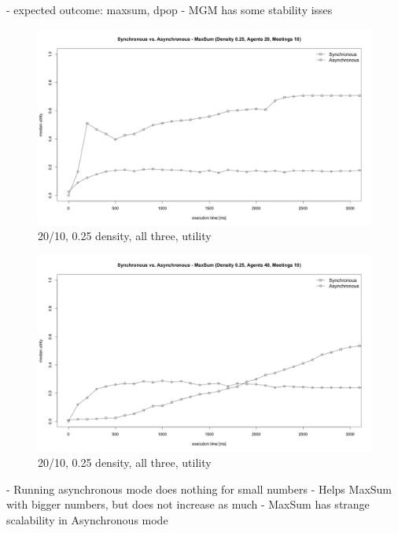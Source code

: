 - expected outcome: maxsum, dpop
- MGM has some stability isses
\begin{figure}[H]
\centering
\includegraphics[width=430px]{graphics/experiments/static/st_11}
\caption{20/10, 0.25 density, all three, utility}
\label{fig:mgm_graph}
\end{figure}
\begin{figure}[H]
\centering
\includegraphics[width=430px]{graphics/experiments/static/st_12}
\caption{20/10, 0.25 density, all three, utility}
\label{fig:mgm_graph}
\end{figure}

- Running asynchronous mode does nothing for small numbers
- Helps MaxSum with bigger numbers, but does not increase as much
- MaxSum has strange scalability in Asynchronous mode

